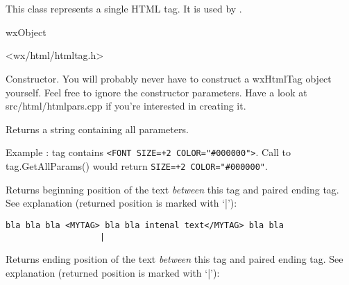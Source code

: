 %
%

\section{}\label{wxhtmltag}

This class represents a single HTML tag. 
It is used by .


wxObject


<wx/html/htmltag.h>


\label{wxhtmltagwxhtmltag}


Constructor. You will probably never have to construct a wxHtmlTag object
yourself. Feel free to ignore the constructor parameters.
Have a look at src/html/htmlpars.cpp if you're interested in creating it.

\label{wxhtmltaggetallparams}


Returns a string containing all parameters.

Example : tag contains {\tt <FONT SIZE=+2 COLOR="\#000000">}. Call to
tag.GetAllParams() would return {\tt SIZE=+2 COLOR="\#000000"}.


\label{wxhtmltaggetbeginpos}


Returns beginning position of the text {\it between} this tag and paired
ending tag. 
See explanation (returned position is marked with `|'):

\begin{verbatim}
bla bla bla <MYTAG> bla bla intenal text</MYTAG> bla bla
                   |
\end{verbatim}


\label{wxhtmltaggetendpos1}


Returns ending position of the text {\it between} this tag and paired
ending tag.
See explanation (returned position is marked with `|'):

